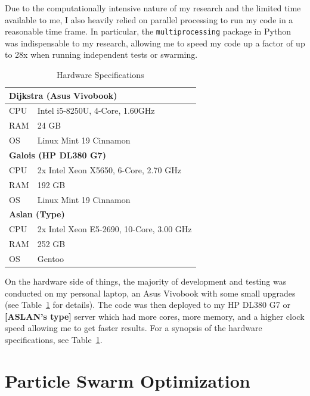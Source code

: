 \documentclass[oneside,12pt,openany]{book}
\begin{document}
	Due to the computationally intensive nature of my research and the limited time available to me, I also heavily relied on parallel processing to run my code in a reasonable time frame. In particular, the \texttt{multiprocessing} package in Python was indispensable to my research, allowing me to speed my code up a factor of up to 28x when running independent tests or swarming.
	
	\begin{table}[!ht]
		\centering
		\begin{tabular}{|l|l|}
			\hline
			\multicolumn{2}{|l|}{\textbf{Dijkstra (Asus Vivobook)}} \\ \hline
			CPU     & Intel i5-8250U, 4-Core, 1.60GHz     \\ \hline
			RAM     & 24 GB                                \\ \hline
			OS      & Linux Mint 19 Cinnamon               \\ \hline
			\multicolumn{2}{|l|}{\textbf{Galois (HP DL380 G7)}}     \\ \hline
			CPU     &  2x Intel Xeon X5650, 6-Core, 2.70 GHz       \\ \hline
			RAM     & 192 GB                               \\ \hline
			OS      & Linux Mint 19 Cinnamon               \\ \hline
			\multicolumn{2}{|l|}{\textbf{Aslan (Type)}}                         \\ \hline
			CPU&    2x  Intel Xeon E5-2690, 10-Core, 3.00 GHz    \\ \hline
			RAM&    252 GB                                  \\ \hline
			OS&    Gentoo                               \\ \hline
		\end{tabular}
		\caption{Hardware Specifications}
		\label{tab:hardware}
	\end{table}

	On the hardware side of things, the majority of development and testing was conducted on my personal laptop, an Asus Vivobook with some small upgrades (see Table~\ref{tab:hardware} for details). The code was then deployed to my HP DL380 G7 or \textbf{[ASLAN's type]} server which had more cores, more memory, and a higher clock speed allowing me to get faster results. For a synopsis of the hardware specifications, see Table~\ref{tab:hardware}. 
	
	\section{Particle Swarm Optimization}
	
\end{document}
